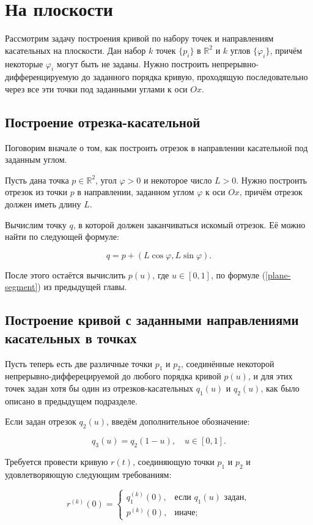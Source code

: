 \section{На плоскости}

Рассмотрим задачу построения кривой по набору точек и направлениям касательных на плоскости. Дан набор $k$ точек
$\{p_i\}$ в $\mathbb{R}^2$ и $k$ углов $\{\varphi_i\}$, причём некоторые $\varphi_i$ могут быть не заданы. Нужно построить
непрерывно-дифференцируемую до заданного порядка кривую, проходящую последовательно через все эти точки под заданными
углами к оси $Ox$.

\subsection*{Построение отрезка-касательной}

Поговорим вначале о том, как построить отрезок в направлении касательной под заданным углом.

Пусть дана точка $p \in \mathbb{R}^2$, угол $\varphi>0$ и некоторое число $L>0$. Нужно построить отрезок из точки $p$
в направлении, заданном углом $\varphi$ к оси $Ox$, причём отрезок должен иметь длину $L$.

Вычислим точку $q$, в которой должен заканчиваться искомый отрезок. Её можно найти по следующей формуле:

$$
q=p+(L\cos\varphi,L\sin\varphi).
$$

После этого остаётся вычислить $p(u)$, где $u \in [0,1]$, по формуле (\ref{plane-segment}) из предыдущей главы.

\subsection*{Построение кривой с заданными направлениями \mbox{касательных} в точках}

Пусть теперь есть две различные точки $p_1$ и $p_2$, соединённые некоторой непрерыв\-но-дифферецируемой до любого
порядка кривой $p(u)$, и для этих точек задан хотя бы один из отрезков-касательных $q_1(u)$ и $q_2(u)$, как было описано
в предыдущем подразделе.

Если задан отрезок $q_2(u)$, введём дополнительное обозначение:

$$
q_3(u)=q_2(1-u), \quad u \in [0,1].
$$

Требуется провести кривую $r(t)$, соединяющую точки $p_1$ и $p_2$ и удовлетворяющую следующим требованиям:

\begin{equation*}
r^{(k)}(0)=
  \begin{cases}
    q_1^{(k)}(0), & \text{если $q_1(u)$ задан}, \\
    p^{(k)}(0),   & \text{иначе};
  \end{cases}
\end{equation*}

